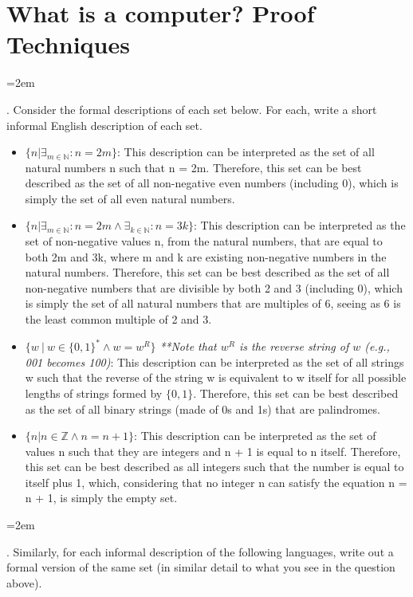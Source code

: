 \documentclass[12pt]{article}
\def\homework{What is a computer? Proof Techniques}
\newcounter{quesnum}
\newcommand{\question}[2][??]{
\begin{list}{\labelitemi}{\leftmargin=2em}
\item [\arabic{quesnum}.] {} {#2}
\end{list}
\addtocounter{quesnum}{1}
}
\begin{document}
\section*{\homework}

\question[3]{
Consider the formal descriptions of each set below. For each, write a short informal English description of each set.
}

\begin{itemize}
    \item $\{n | \exists_{m \in \mathbb{N}} : n=2m\}$: This description can be interpreted as the set of all natural numbers n such that n = 2m. Therefore, this set can be best described as the set of all non-negative even numbers (including 0), which is simply the set of all even natural numbers.

    \item $\{n | \exists_{m \in \mathbb{N}} : n=2m \wedge \exists_{k \in \mathbb{N}} : n=3k \}$: This description can be interpreted as the set of non-negative values n, from the natural numbers, that are equal to both 2m and 3k, where m and k are existing non-negative numbers in the natural numbers. Therefore, this set can be best described as the set of all non-negative numbers that are divisible by both 2 and 3 (including 0), which is simply the set of all natural numbers that are multiples of 6, seeing as 6 is the least common multiple of 2 and 3.

    \item $\{ w \ | \ w \in \{0,1\}^* \wedge w=w^R \}$ \emph{**Note that $w^R$ is the reverse string of $w$ (e.g., 001 becomes 100)}: This description can be interpreted as the set of all strings w such that the reverse of the string w is equivalent to w itself for all possible lengths of strings formed by $\{0,1\}$. Therefore, this set can be best described as the set of all binary strings (made of 0s and 1s) that are palindromes.
 
    \item $\{ n | n \in \mathbb{Z} \wedge n=n+1 \}$: This description can be interpreted as the set of values n such that they are integers and n + 1 is equal to n itself. Therefore, this set can be best described as all integers such that the number is equal to itself plus 1, which, considering that no integer n can satisfy the equation n = n + 1, is simply the empty set.
\end{itemize}

\vspace{12pt}

\question[3]{
Similarly, for each informal description of the following languages, write out a formal version of the same set (in similar detail to what you see in the question above).
}
\end{document}
